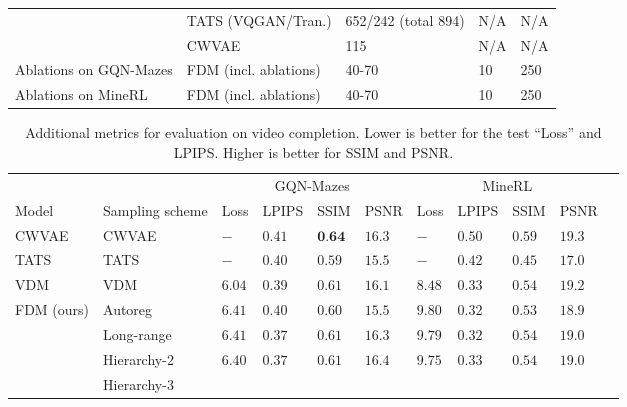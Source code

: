 \begin{table}[t]
\begin{tabular}{p{1.1cm}lllp{0.7cm}}
                                       &  TATS (VQGAN/Tran.)       & 652/242 (total 894)     & N/A  & N/A      \\
                                       &  CWVAE                     & 115   & N/A   & N/A      \\
   \midrule
    Ablations on GQN-Mazes   &  FDM (incl. ablations)     & 40-70  & 10    & 250      \\
   \midrule
    Ablations on MineRL  &  FDM (incl. ablations)     & 40-70  & 10    & 250      \\
    \bottomrule
  \end{tabular}
\end{table}

\begin{table}[t]
  \tiny
  \caption{Additional metrics for evaluation on video completion. Lower is better for the test ``Loss'' and LPIPS. Higher is better for SSIM and PSNR.}
  \label{tab:fdm-extra-metrics}
  \centering
  \begin{tabular}{lllllllllll}
    \toprule
    \multicolumn{1}{r}{} & & \multicolumn{4}{c}{GQN-Mazes}  & \multicolumn{4}{c}{MineRL} \\
    \cmidrule(r){3-6} \cmidrule(r){7-10}
    Model &  Sampling scheme    & Loss  & LPIPS  & SSIM   & PSNR  & Loss  & LPIPS   & SSIM   &  PSNR \\
    \midrule
    \multirow{1}{*}{CWVAE~\citep{saxena2021clockwork}}& CWVAE
    & $-   $ & $0.41$  & $\textbf{0.64}$  & $16.3$  & $-   $  & $0.50$  & $\mathbf{0.59}$  & $\mathbf{19.3}$ \\
    \midrule
    \multirow{1}{*}{TATS~\citep{ge2022long}}& TATS
    & $-$ & $0.40$  & $0.59$  & $15.5$  & $-$  & $0.42$  & $0.45$  & $17.0$  \\
    \midrule
    \multirow{1}{*}{VDM~\citep{ho2022video}}& VDM
    & $\mathbf{6.04}$ & $0.39$  & $0.61$  & $16.1$  & $\mathbf{8.48}$  & $0.33$  & $0.54$  & $19.2$  \\
    \midrule
\multirow{5}{*}{FDM (ours)}   &  Autoreg
    & $6.41$ & $0.40$  & $0.60$  & $15.5$  & $9.80$  & $\mathbf{0.32}$  & $0.53$  & $18.9$  \\
                            &  Long-range
    & $6.41$ & $\mathbf{0.37}$  & $0.61$  & $16.3$  & $9.79$  & $\mathbf{0.32}$  & $0.54$  & $19.0$        \\
                            &  Hierarchy-2
    & $6.40$ & $\mathbf{0.37}$  & $0.61$  & $\mathbf{16.4}$  & $9.75$  & $0.33$  & $0.54$  & $19.0$ \\
                            &  Hierarchy-3

\end{tabular}
\end{table}
